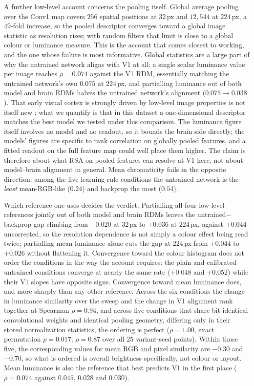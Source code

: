 \documentclass[10pt,twocolumn]{article}
\begin{document}
A further low-level account concerns the pooling itself. Global average pooling over the Conv1 map covers $256$ spatial positions at $32$\,px and $12{,}544$ at $224$\,px, a $49$-fold increase, so the pooled descriptor converges toward a global image statistic as resolution rises; with random filters that limit is close to a global colour or luminance measure. This is the account that comes closest to working, and the one whose failure is most informative. Global statistics are a large part of why the untrained network aligns with V1 at all: a single scalar luminance value per image reaches $\rho = 0.074$ against the V1 RDM, essentially matching the untrained network's own $0.075$ at $224$\,px, and partialling luminance out of both model and brain RDMs halves the untrained network's alignment ($0.075 \to 0.038$). That early visual cortex is strongly driven by low-level image properties is not itself new \citep{goddard2020}; what we quantify is that in this dataset a one-dimensional descriptor matches the best model we tested under this comparison. The luminance figure itself involves no model and no readout, so it bounds the brain side directly; the models' figures are specific to rank correlation on globally pooled features, and a fitted readout on the full feature map could well place them higher. The claim is therefore about what RSA on pooled features can resolve at V1 here, not about model--brain alignment in general. Mean chromaticity fails in the opposite direction: among the five learning-rule conditions the untrained network is the \emph{least} mean-RGB-like ($0.24$) and backprop the most ($0.54$).

Which reference one uses decides the verdict. Partialling all four low-level references jointly out of both model and brain RDMs leaves the untrained$-$backprop gap climbing from $-0.020$ at $32$\,px to $+0.036$ at $224$\,px, against $+0.044$ uncorrected, so the resolution dependence is not simply a colour effect being read twice; partialling mean luminance alone cuts the gap at $224$\,px from $+0.044$ to $+0.026$ without flattening it. Convergence toward the colour histogram does not order the conditions in the way the account requires: the plain and calibrated untrained conditions converge at nearly the same rate ($+0.048$ and $+0.052$) while their V1 slopes have opposite signs. Convergence toward mean luminance does, and more sharply than any other reference. Across the six conditions the change in luminance similarity over the sweep and the change in V1 alignment rank together at Spearman $\rho = 0.94$, and across five conditions that share bit-identical convolutional weights and identical pooling geometry, differing only in their stored normalization statistics, the ordering is perfect ($\rho = 1.00$, exact permutation $p = 0.017$; $\rho = 0.87$ over all $25$ variant-seed points). Within those five, the corresponding values for mean RGB and pixel similarity are $-0.30$ and $-0.70$, so what is ordered is overall brightness specifically, not colour or layout. Mean luminance is also the reference that best predicts V1 in the first place ($\rho = 0.074$ against $0.045$, $0.028$ and $0.030$).
\end{document}
